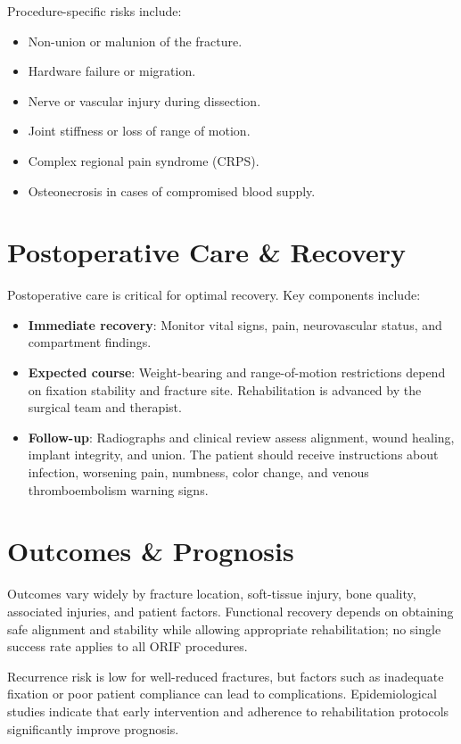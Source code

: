 Procedure-specific risks include:

\begin{itemize}
  \item Non-union or malunion of the fracture.
  \item Hardware failure or migration.
  \item Nerve or vascular injury during dissection.
  \item Joint stiffness or loss of range of motion.
  \item Complex regional pain syndrome (CRPS).
  \item Osteonecrosis in cases of compromised blood supply.
\end{itemize}

\section*{Postoperative Care \& Recovery}

Postoperative care is critical for optimal recovery. Key components include:

\begin{itemize}
  \item \textbf{Immediate recovery}: Monitor vital signs, pain, neurovascular status, and compartment findings.
  \item \textbf{Expected course}: Weight-bearing and range-of-motion restrictions depend on fixation stability and fracture site. Rehabilitation is advanced by the surgical team and therapist.
  \item \textbf{Follow-up}: Radiographs and clinical review assess alignment, wound healing, implant integrity, and union. The patient should receive instructions about infection, worsening pain, numbness, color change, and venous thromboembolism warning signs.
\end{itemize}

\section*{Outcomes \& Prognosis}

Outcomes vary widely by fracture location, soft-tissue injury, bone quality, associated injuries, and patient factors. Functional recovery depends on obtaining safe alignment and stability while allowing appropriate rehabilitation; no single success rate applies to all ORIF procedures.

Recurrence risk is low for well-reduced fractures, but factors such as inadequate fixation or poor patient compliance can lead to complications. Epidemiological studies indicate that early intervention and adherence to rehabilitation protocols significantly improve prognosis.

